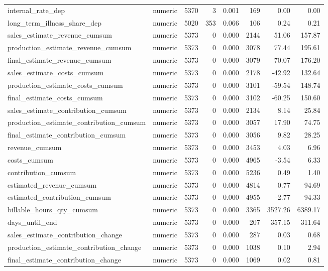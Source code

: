 \begin{landscape}
\begin{longtable}[t]{llrrrrrr}
internal\_rate\_dep & numeric & 5370 & 3 & 0.001 & 169 & 0.00 & 0.00\\
long\_term\_illness\_share\_dep & numeric & 5020 & 353 & 0.066 & 106 & 0.24 & 0.21\\
sales\_estimate\_revenue\_cumsum & numeric & 5373 & 0 & 0.000 & 2144 & 51.06 & 157.87\\
production\_estimate\_revenue\_cumsum & numeric & 5373 & 0 & 0.000 & 3078 & 77.44 & 195.61\\
final\_estimate\_revenue\_cumsum & numeric & 5373 & 0 & 0.000 & 3079 & 70.07 & 176.20\\
sales\_estimate\_costs\_cumsum & numeric & 5373 & 0 & 0.000 & 2178 & -42.92 & 132.64\\
production\_estimate\_costs\_cumsum & numeric & 5373 & 0 & 0.000 & 3101 & -59.54 & 148.74\\
final\_estimate\_costs\_cumsum & numeric & 5373 & 0 & 0.000 & 3102 & -60.25 & 150.60\\
sales\_estimate\_contribution\_cumsum & numeric & 5373 & 0 & 0.000 & 2134 & 8.14 & 25.84\\
production\_estimate\_contribution\_cumsum & numeric & 5373 & 0 & 0.000 & 3057 & 17.90 & 74.75\\
final\_estimate\_contribution\_cumsum & numeric & 5373 & 0 & 0.000 & 3056 & 9.82 & 28.25\\
revenue\_cumsum & numeric & 5373 & 0 & 0.000 & 3453 & 4.03 & 6.96\\
costs\_cumsum & numeric & 5373 & 0 & 0.000 & 4965 & -3.54 & 6.33\\
contribution\_cumsum & numeric & 5373 & 0 & 0.000 & 5236 & 0.49 & 1.40\\
estimated\_revenue\_cumsum & numeric & 5373 & 0 & 0.000 & 4814 & 0.77 & 94.69\\
estimated\_contribution\_cumsum & numeric & 5373 & 0 & 0.000 & 4955 & -2.77 & 94.33\\
billable\_hours\_qty\_cumsum & numeric & 5373 & 0 & 0.000 & 3365 & 3527.26 & 6389.17\\
days\_until\_end & numeric & 5373 & 0 & 0.000 & 207 & 357.15 & 311.64\\
sales\_estimate\_contribution\_change & numeric & 5373 & 0 & 0.000 & 287 & 0.03 & 0.68\\
production\_estimate\_contribution\_change & numeric & 5373 & 0 & 0.000 & 1038 & 0.10 & 2.94\\
final\_estimate\_contribution\_change & numeric & 5373 & 0 & 0.000 & 1069 & 0.02 & 0.81\\

\end{longtable}
\end{landscape}
